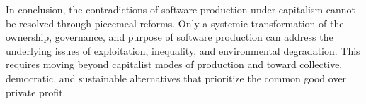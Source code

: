 \begin{refsection}
In conclusion, the contradictions of software production under capitalism cannot be resolved through piecemeal reforms. Only a systemic transformation of the ownership, governance, and purpose of software production can address the underlying issues of exploitation, inequality, and environmental degradation. This requires moving beyond capitalist modes of production and toward collective, democratic, and sustainable alternatives that prioritize the common good over private profit.

\printbibliography[heading=subbibliography]
\end{refsection}